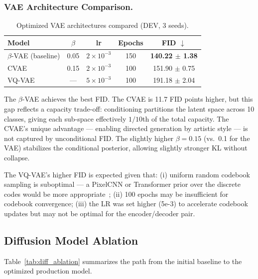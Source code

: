 \documentclass[runningheads]{llncs}
\begin{document}
\subsubsection{VAE Architecture Comparison.}

\begin{table}[htbp]
\caption{Optimized VAE architectures compared (DEV, 3 seeds).}\label{tab:vae_arch_compare}
\centering
\begin{tabular}{lcccc}
\toprule
Model & $\beta$ & lr & Epochs & FID $\downarrow$ \\
\midrule
$\beta$-VAE (baseline) & 0.05 & $2{\times}10^{-3}$ & 150 & \textbf{140.22 $\pm$ 1.38} \\
CVAE & 0.15 & $2{\times}10^{-3}$ & 100 & 151.90 $\pm$ 0.75 \\
VQ-VAE & — & $5{\times}10^{-3}$ & 100 & 191.18 $\pm$ 2.04 \\
\bottomrule
\end{tabular}
\end{table}

The $\beta$-VAE achieves the best FID. The CVAE is 11.7 FID points higher, but this gap reflects a capacity trade-off: conditioning partitions the latent space across 10 classes, giving each sub-space effectively $1/10$th of the total capacity. The CVAE's unique advantage — enabling directed generation by artistic style — is not captured by unconditional FID. The slightly higher $\beta=0.15$ (vs.\ 0.1 for the VAE) stabilizes the conditional posterior, allowing slightly stronger KL without collapse.

The VQ-VAE's higher FID is expected given that: (i) uniform random codebook sampling is suboptimal — a PixelCNN or Transformer prior over the discrete codes would be more appropriate~\cite{oord2017}; (ii) 100 epochs may be insufficient for codebook convergence; (iii) the LR was set higher (5e-3) to accelerate codebook updates but may not be optimal for the encoder/decoder pair.

\subsection{Diffusion Model Ablation}\label{sec:ablation_diff}

Table~\ref{tab:diff_ablation} summarizes the path from the initial baseline to the optimized production model.
\end{document}
